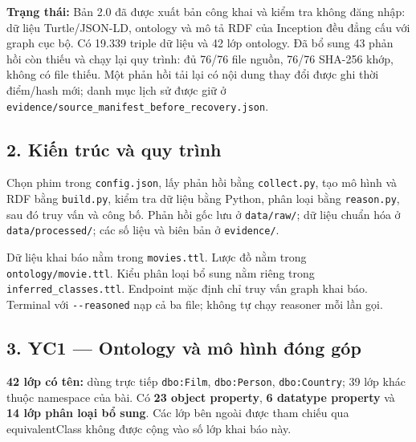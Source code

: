 \documentclass[
  11pt,
]{article}
\begin{document}
\textbf{Trạng thái:} Bản 2.0 đã được xuất bản công khai và kiểm tra
không đăng nhập: dữ liệu
Turtle/\allowbreak{}\allowbreak{}J\allowbreak{}\allowbreak{}S\allowbreak{}O\allowbreak{}N-\allowbreak{}\allowbreak{}L\allowbreak{}D,
ontology và mô tả RDF của Inception đều đẳng cấu với graph cục bộ. Có
19.339 triple dữ liệu và 42 lớp ontology. Đã bổ sung 43 phản hồi còn
thiếu và chạy lại quy trình: đủ 76/76 file nguồn, 76/76 SHA-256 khớp,
không có file thiếu. Một phản hồi tải lại có nội dung thay đổi được ghi
thời điểm/hash mới; danh mục lịch sử được giữ ở
\texttt{evidence\allowbreak{}/\allowbreak{}source\_\allowbreak{}manifest\allowbreak{}\_\allowbreak{}before\_\allowbreak{}recovery\allowbreak{}.\allowbreak{}json}.

\subsection{2. Kiến trúc và quy
trình}\label{kiux1ebfn-truxfac-vuxe0-quy-truxecnh}

Chọn phim trong \texttt{config.\allowbreak{}j\allowbreak{}son}, lấy phản
hồi bằng \texttt{collect.\allowbreak{}py}, tạo mô hình và RDF bằng
\texttt{build.\allowbreak{}py\allowbreak{}}, kiểm tra dữ liệu bằng
Python, phân loại bằng \texttt{reason.\allowbreak{}p\allowbreak{}y}, sau
đó truy vấn và công bố. Phản hồi gốc lưu ở
\texttt{data/\allowbreak{}raw\allowbreak{}/\allowbreak{}}; dữ liệu chuẩn
hóa ở \texttt{data/\allowbreak{}pro\allowbreak{}cessed/\allowbreak{}};
các số liệu và biên bản ở \texttt{evidence\allowbreak{}/\allowbreak{}}.

Dữ liệu khai báo nằm trong
\texttt{movies.\allowbreak{}t\allowbreak{}tl}. Lược đồ nằm trong
\texttt{ontology\allowbreak{}/\allowbreak{}movie.\allowbreak{}t\allowbreak{}tl}.
Kiểu phân loại bổ sung nằm riêng trong
\texttt{inferred\allowbreak{}\_\allowbreak{}classes\allowbreak{}.\allowbreak{}ttl}.
Endpoint mặc định chỉ truy vấn graph khai báo. Terminal với
\texttt{-\allowbreak{}-\allowbreak{}reason\allowbreak{}ed} nạp cả ba
file; không tự chạy reasoner mỗi lần gọi.

\newpage

\subsection{3. YC1 --- Ontology và mô hình đóng
góp}\label{yc1-ontology-vuxe0-muxf4-huxecnh-ux111uxf3ng-guxf3p}

\textbf{42 lớp có tên:} dùng trực tiếp
\texttt{dbo:\allowbreak{}\allowbreak{}Film\allowbreak{}},
\texttt{dbo:\allowbreak{}\allowbreak{}Pers\allowbreak{}on},
\texttt{dbo:\allowbreak{}\allowbreak{}Coun\allowbreak{}try}; 39 lớp khác
thuộc namespace của bài. Có \textbf{23 object property}, \textbf{6
datatype property} và \textbf{14 lớp phân loại bổ sung}. Các lớp bên
ngoài được tham chiếu qua equivale\allowbreak{}nt\allowbreak{}Class
không được cộng vào số lớp khai báo này.
\end{document}
